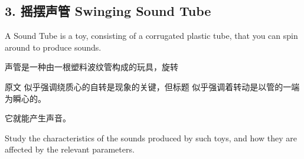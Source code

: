 \documentclass[a4paper,10pt,english]{sphinxmanual}
\begin{document}
\subsection{3. 摇摆声管 Swinging Sound Tube}
\label{\detokenize{8. Appendix:swinging-sound-tube}}
A Sound Tube is a toy, consisting of a corrugated plastic tube, that you can spin around to produce sounds.

声管是一种由一根塑料波纹管构成的玩具，旋转 %
\begin{footnote}[2]\sphinxAtStartFootnote
原文  似乎强调绕质心的自转是现象的关键，但标题  似乎强调着转动是以管的一端为瞬心的。
%
\end{footnote} 它就能产生声音。

Study the characteristics of the sounds produced by such toys, and how they are affected by the relevant parameters.
\end{document}
